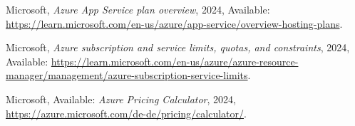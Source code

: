 \documentclass{llncs}
\begin{document}
\begin{thebibliography}{5}

    Microsoft,
    \emph{Azure App Service plan overview},
    2024, Available:
    \url{https://learn.microsoft.com/en-us/azure/app-service/overview-hosting-plans}.

    Microsoft,
    \emph{Azure subscription and service limits, quotas, and constraints},
    2024, Available:
    \url{https://learn.microsoft.com/en-us/azure/azure-resource-manager/management/azure-subscription-service-limits}.

    Microsoft, Available:
    \emph{Azure Pricing Calculator}, 2024,
    \url{https://azure.microsoft.com/de-de/pricing/calculator/}.



\end{thebibliography}
\end{document}
